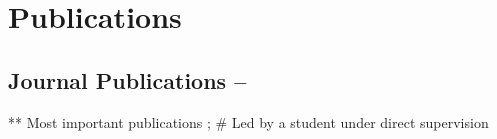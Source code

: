 \section{Publications}

\subsection{Journal Publications -- \href{https://ui.adsabs.harvard.edu/search/filter_database_fq_database=OR&filter_database_fq_database=database\%3A\%22astronomy\%22&fq=\%7B!type\%3Daqp\%20v\%3D\%24fq_database\%7D&fq_database=(database\%3A\%22astronomy\%22)&q=\%3Dauthor\%3A(\%22Kim\%2C\%20Jeong-Gyu\%22)&sort=date\%20desc\%2C\%20bibcode\%20desc}{\color{dodgerblue}{ADS
Search}}}

** Most important publications ; \# Led by a student under direct supervision

